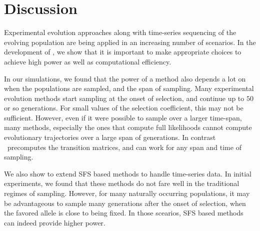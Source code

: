 \section{Discussion}
Experimental
evolution approaches along with time-series sequencing of the evolving
population are being applied in an increasing number of scenarios. In
the development of \comale, we show that it is important to make
appropriate choices to achieve high power as well as computational
efficiency.

In our simulations, we found that the power of a method also depends a
lot on when the populations are sampled, and the span of
sampling. Many experimental evolution methods start sampling at the
onset of selection, and continue up to $50$ or so generations. For
small values of the selection coefficient, this may not be
sufficient. However, even if it were possible to sample over a larger
time-span, many methods, especially the ones that compute full
likelihoods cannot compute evolutionary trajectories over a large span
of generations. In contrast \comale\ precomputes the transition
matrices, and can work for any span and time of sampling.

We also show to extend SFS based methods to handle time-series
data. In initial experiments, we found that these methods do not fare
well in the traditional regimes of sampling. However, for many naturally
occurring populations, it may be advantageous to sample many
generations after the onset of selection, when the favored allele is
close to being fixed. In those scearios, SFS based methods can indeed
provide higher power.